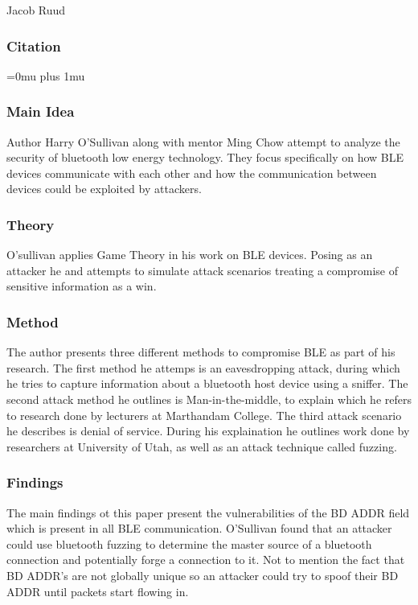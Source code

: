 \noindent
Jacob Ruud

\noindent
\subsubsection{Citation}

\Urlmuskip=0mu plus 1mu\relax


\subsubsection{Main Idea}

\noindent
Author Harry O'Sullivan along with mentor Ming Chow attempt to analyze the security of bluetooth low energy technology. They focus specifically on how BLE devices communicate with each other and how the communication between devices could be exploited by attackers.

\subsubsection{Theory}

\noindent
O'sullivan applies Game Theory in his work on BLE devices. Posing as an attacker he and attempts to simulate attack scenarios treating a compromise of sensitive information as a win.

\subsubsection{Method}

\noindent
The author presents three different methods to compromise BLE as part of his research. The first method he attemps is an eavesdropping attack, during which he tries to capture information about a bluetooth host device using a sniffer. The second attack method he outlines is Man-in-the-middle, to explain which he refers to research done by lecturers at Marthandam College. The third attack scenario he describes is denial of service. During his explaination he outlines work done by researchers at University of Utah, as well as an attack technique called fuzzing.

\subsubsection{Findings}

\noindent
The main findings ot this paper present the vulnerabilities of the BD ADDR field which is present in all BLE communication. O'Sullivan found that an attacker could use bluetooth fuzzing to determine the master source of a bluetooth connection and potentially forge a connection to it. Not to mention the fact that BD ADDR's are not globally unique so an attacker could try to spoof their BD ADDR until packets start flowing in.

